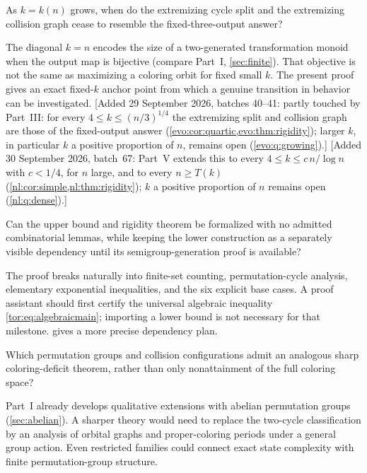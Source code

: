\documentclass[11pt,a4paper]{article}
\numberwithin{equation}{section}
\theoremstyle{definition}
\theoremstyle{remark}
\begin{document}
\begin{question}\label{tor:q:growing}
As $k=k(n)$ grows, when do the extremizing cycle split and the extremizing
collision graph cease to resemble the fixed-three-output answer?
\end{question}
The diagonal $k=n$ encodes the size of a two-generated transformation monoid
when the output map is bijective (compare Part~I, \cref{sec:finite}). That
objective is not the same as maximizing a coloring orbit for fixed small $k$.
The present proof gives an exact fixed-$k$ anchor point from which a genuine
transition in behavior can be investigated.
[Added 29 September 2026, batches 40--41: partly touched by Part~III: for every
$4\le k\le(n/3)^{1/4}$ the extremizing split and collision graph are those of
the fixed-output answer (\cref{evo:cor:quartic,evo:thm:rigidity}); larger
$k$, in particular $k$ a positive proportion of $n$, remains open
(\cref{evo:q:growing}).]
[Added 30 September 2026, batch~67: Part~V extends this to every $4\le k\le c\,n/\log n$ with
$c<1/4$, for $n$ large, and to every $n\ge T(k)$
(\cref{nl:cor:simple,nl:thm:rigidity}); $k$ a positive proportion of $n$
remains open (\cref{nl:q:dense}).]

\begin{question}\label{tor:q:formal}
Can the upper bound and rigidity theorem be formalized with no admitted
combinatorial lemmas, while keeping the lower construction as a separately
visible dependency until its semigroup-generation proof is available?
\end{question}
The proof breaks naturally into finite-set counting, permutation-cycle
analysis, elementary exponential inequalities, and the six explicit base
cases. A proof assistant should first certify the universal algebraic
inequality \eqref{tor:eq:algebraicmain}; importing a lower bound is not
necessary for that milestone.  gives a more precise
dependency plan.

\begin{question}\label{tor:q:groups}
Which permutation groups and collision configurations admit an analogous
sharp coloring-deficit theorem, rather than only nonattainment of the full
coloring space?
\end{question}
Part~I already develops qualitative extensions with abelian permutation groups
(\cref{sec:abelian}). A sharper theory would need to replace the two-cycle
classification by an analysis of orbital graphs and proper-coloring periods
under a general group action. Even restricted families could connect exact
state complexity with finite permutation-group structure.
\end{document}
